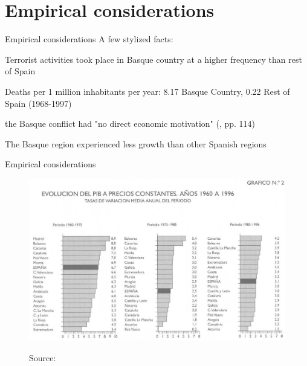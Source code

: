 \documentclass[notes,11pt, aspectratio=169]{beamer}
\newenvironment{wideitemize}{\itemize\addtolength{\itemsep}{10pt}}{\enditemize}
\begin{document}
\section{Empirical considerations}

\begin{frame}{Empirical considerations}
    A few stylized facts: \medskip 
    \begin{wideitemize}
        \item Terrorist activities took place in Basque country at a higher frequency than rest of Spain \medskip 
        \begin{wideitemize}
            \item Deaths per 1 million inhabitants per year: 8.17 Basque Country, 0.22 Rest of Spain (1968-1997) \pause
        \end{wideitemize}
        \item the Basque conflict had "no direct economic motivation" (\cite{abadie_economic_2003}, pp. 114) \pause 
        \item The Basque region experienced less growth than other Spanish regions
    \end{wideitemize}
\end{frame}

\begin{frame}{Empirical considerations}
    \begin{figure}
    \centering
        \includegraphics[width = .75\linewidth]{figures/evolucion_pib.png}
        \label{fig:evolucion}
        \caption*{\small Source: \cite{fundacion_bbv_renta_1999}}
    \end{figure}
\end{frame}
\end{document}

